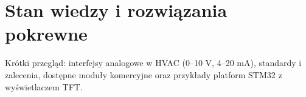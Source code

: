 \section{Stan wiedzy i rozwiązania pokrewne}
Krótki przegląd: interfejsy analogowe w HVAC (0–10 V, 4–20 mA), standardy i zalecenia, dostępne moduły komercyjne oraz przykłady platform STM32 z wyświetlaczem TFT.